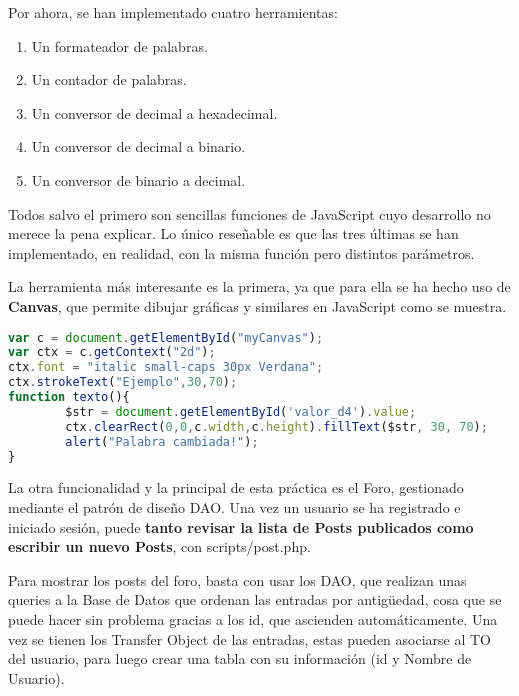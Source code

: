 \documentclass[12pt]{report}
\begin{document}
Por ahora, se han implementado cuatro herramientas:
\begin{enumerate}
    \item Un formateador de palabras.
    \item Un contador de palabras.
    \item Un conversor de decimal a hexadecimal.
    \item Un conversor de decimal a binario.
    \item Un conversor de binario a decimal.
\end{enumerate}
Todos salvo el primero son sencillas funciones de JavaScript cuyo desarrollo no merece la pena explicar. Lo único reseñable es que las tres últimas se han implementado, en realidad, con la misma función pero distintos parámetros.

La herramienta más interesante es la primera, ya que para ella se ha hecho uso de \textbf{Canvas}, que permite dibujar gráficas y similares en JavaScript como se muestra.

\begin{figure}[h]
    \qquad
    \label{fig:example}%
\end{figure}

\begin{lstlisting}[language=JavaScript]
var c = document.getElementById("myCanvas");
var ctx = c.getContext("2d");
ctx.font = "italic small-caps 30px Verdana";
ctx.strokeText("Ejemplo",30,70);
function texto(){
        $str = document.getElementById('valor_d4').value;
        ctx.clearRect(0,0,c.width,c.height).fillText($str, 30, 70);
        alert("Palabra cambiada!");
}
\end{lstlisting}

La otra funcionalidad y la principal de esta práctica es el Foro, gestionado mediante el patrón de diseño DAO. Una vez un usuario se ha registrado e iniciado sesión, puede \textbf{tanto revisar la lista de Posts publicados como escribir un nuevo Posts}, con scripts/post.php.

Para mostrar los posts del foro, basta con usar los DAO, que realizan unas queries a la Base de Datos que ordenan las entradas por antigüedad, cosa que se puede hacer sin problema gracias a los id, que ascienden automáticamente. Una vez se tienen los Transfer Object de las entradas, estas pueden asociarse al TO del usuario, para luego crear una tabla con su información (id y Nombre de Usuario).
\newline
\end{document}
